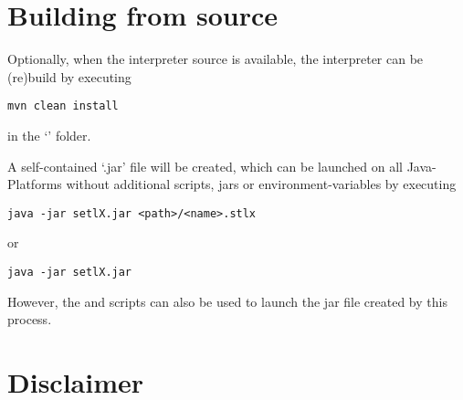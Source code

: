 \section{Building from source}

Optionally, when the interpreter source is available, the interpreter can be (re)build by executing

\begin{lstlisting}[frame=none,numbers=none]
mvn clean install
\end{lstlisting}

in the `' folder.

A self-contained `.jar' file will be created, which can be launched on all Java-Platforms without additional scripts, jars or environment-variables by executing

\begin{lstlisting}[frame=none,numbers=none]
java -jar setlX.jar <path>/<name>.stlx
\end{lstlisting}

or

\begin{lstlisting}[frame=none,numbers=none]
java -jar setlX.jar
\end{lstlisting}

However, the  and  scripts can also be used to launch the jar file created by this process.

\section{Disclaimer}



